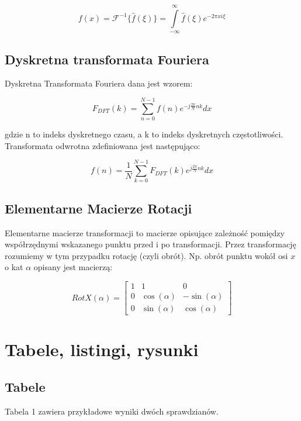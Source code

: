 \documentclass[a4paper,11pt]{article}
\begin{document}
\begin{equation}
	 f(x) = \mathcal{F}^{-1}\{\widehat{f}(\xi)\} = \int\limits_{-\infty}^{\infty}\widehat{f}(\xi)e^{-2\pi x i \xi}
\end{equation}

\subsection{Dyskretna transformata Fouriera}
Dyskretna Transformata Fouriera dana jest wzorem\cite{fourie2}:

\begin{equation}
	F_{DFT}(k) = \sum\limits_{n = 0}^{N - 1}f(n)e^{-j\displaystyle \frac{2\pi}{N} nk} dx
\end{equation}

gdzie n to indeks dyskretnego czasu, a k to indeks dyskretnych częstotliwości.
Transformata odwrotna zdefiniowana jest następująco\cite{fourie2}:

\begin{equation}
	f(n) = \frac{1}{N}\sum\limits_{k=0}^{N-1}F_{DFT}(k)e^{j\displaystyle \frac{2\pi}{N} nk} dx
\end{equation}


\subsection{Elementarne Macierze Rotacji}

Elementarne macierze transformacji to macierze opisujące zależność pomiędzy
współrzędnymi wskazanego punktu przed i po transformacji. Przez transformację
rozumiemy w tym przypadku rotację (czyli obrót). Np. obrót punktu wokół
osi $x$ o kat $\alpha$ opisany jest macierzą:

$$ RotX(\alpha) = \left [ \begin{array}{ccc}
	1 & 1 & 0 \\
	0 & \cos({\alpha}) & -\sin({\alpha}) \\
	0 & \sin({\alpha}) & \cos({\alpha}) 
\end{array}
\right ] $$


\section{Tabele, listingi, rysunki}
\subsection{Tabele}

Tabela 1 zawiera przykładowe wyniki dwóch sprawdzianów.
\end{document}
